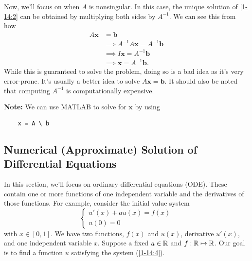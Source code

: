 \documentclass[letterpaper]{article}
\newcommand{\0}{\mathbf{0}}
\renewcommand{\b}{\mathbf{b}}
\newcommand{\x}{\mathbf{x}}
\begin{document}
Now, we'll focus on when $A$ is nonsingular. In this case, the unique solution of \ref{1-14:2} can be obtained by multiplying both sides by $A^{-1}$. We can see this from how 
\begin{equation*}
    \begin{aligned}
        A\x &= \b \\ 
            &\implies A^{-1} A \x = A^{-1} \b \\ 
            &\implies I\x = A^{-1}\b \\ 
            &\implies \x = A^{-1}\b. 
    \end{aligned}
\end{equation*}
While this is guaranteed to solve the problem, doing so is a bad idea as it's very error-prone. It's usually a better idea to solve $A\x = \b$. It should also be noted that computing $A^{-1}$ is computationally expensive.

\bigskip 

\textbf{Note:} We can use MATLAB to solve for $\x$ by using 
\begin{verbatim}
    x = A \ b\end{verbatim}

\subsection{Numerical (Approximate) Solution of Differential Equations}
In this section, we'll focus on ordinary differential equations (ODE). These contain one or more functions of one independent variable and the derivatives of those functions. For example, consider the initial value system 
\begin{equation}\label{1-14:4}
    \begin{cases}
        u'(x) + au(x) = f(x) \\ 
        u(0) = 0
    \end{cases}
\end{equation}
with $x \in [0, 1]$. We have two functions, $f(x)$ and $u(x)$, derivative $u'(x)$, and one independent variable $x$. Suppose a fixed $a \in \mathbb{R}$ and $f: \mathbb{R} \mapsto \mathbb{R}$. Our goal is to find a function $u$ satisfying the system (\ref{1-14:4}).
\end{document}
